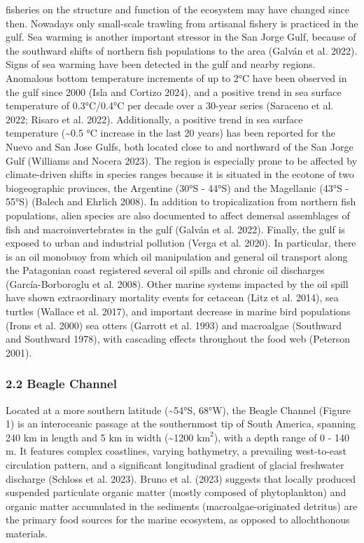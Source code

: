 \documentclass[
]{article}
\begin{document}
fisheries on the structure and function of the ecosystem may have
changed since then. Nowadays only small-scale trawling from artisanal
fishery is practiced in the gulf. Sea warming is another important
stressor in the San Jorge Gulf, because of the southward shifts of
northern fish populations to the area (Galván et al. 2022). Signs of sea
warming have been detected in the gulf and nearby regions. Anomalous
bottom temperature increments of up to 2°C have been observed in the
gulf since 2000 (Isla and Cortizo 2024), and a positive trend in sea
surface temperature of 0.3°C/0.4°C per decade over a 30-year series
(Saraceno et al. 2022; Risaro et al. 2022). Additionally, a positive
trend in sea surface temperature (\textasciitilde0.5 °C increase in the
last 20 years) has been reported for the Nuevo and San Jose Gulfs, both
located close to and northward of the San Jorge Gulf (Williams and
Nocera 2023). The region is especially prone to be affected by
climate-driven shifts in species ranges because it is situated in the
ecotone of two biogeographic provinces, the Argentine (30°S - 44°S) and
the Magellanic (43°S - 55°S) (Balech and Ehrlich 2008). In addition to
tropicalization from northern fish populations, alien species are also
documented to affect demersal assemblages of fish and macroinvertebrates
in the gulf (Galván et al. 2022). Finally, the gulf is exposed to urban
and industrial pollution (Verga et al. 2020). In particular, there is an
oil monobuoy from which oil manipulation and general oil transport along
the Patagonian coast registered several oil spills and chronic oil
discharges (García-Borboroglu et al. 2008). Other marine systems
impacted by the oil spill have shown extraordinary mortality events for
cetacean (Litz et al. 2014), sea turtles (Wallace et al. 2017), and
important decrease in marine bird populations (Irons et al. 2000) sea
otters (Garrott et al. 1993) and macroalgae (Southward and Southward
1978), with cascading effects throughout the food web (Peterson 2001).

\subsubsection{2.2 Beagle Channel}\label{beagle-channel}

Located at a more southern latitude (\textasciitilde54°S, 68°W), the
Beagle Channel (Figure 1) is an interoceanic passage at the southernmost
tip of South America, spanning 240 km in length and 5 km in width
(\textasciitilde1200 \(\text{km}^2\)), with a depth range of 0 - 140 m.
It features complex coastlines, varying bathymetry, a prevailing
west-to-east circulation pattern, and a significant longitudinal
gradient of glacial freshwater discharge (Schloss et al. 2023). Bruno et
al. (2023) suggests that locally produced suspended particulate organic
matter (mostly composed of phytoplankton) and organic matter accumulated
in the sediments (macroalgae-originated detritus) are the primary food
sources for the marine ecosystem, as opposed to allochthonous materials.
\end{document}
